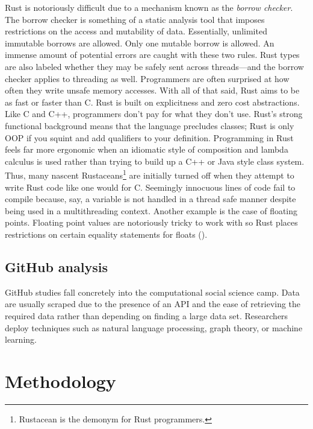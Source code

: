 \documentclass[12pt, a4paper]{article}
\begin{document}
Rust is notoriously difficult due to a mechanism known as the \textit{borrow checker}. The borrow checker is something of a static analysis tool that imposes restrictions on the access and mutability of data. Essentially, unlimited immutable borrows are allowed. Only one mutable borrow is allowed. An immense amount of potential errors are caught with these two rules. Rust types are also labeled whether they may be safely sent across threads---and the borrow checker applies to threading as well. Programmers are often surprised at how often they write unsafe memory accesses. With all of that said, Rust aims to be as fast or faster than C. Rust is built on explicitness and zero cost abstractions. Like C and C++, programmers don't pay for what they don't use. Rust's strong functional background means that the language precludes classes; Rust is only OOP if you squint and add qualifiers to your definition. Programming in Rust feels far more ergonomic when an idiomatic style of composition and lambda calculus is used rather than trying to build up a C++ or Java style class system. Thus, many nascent Rustaceans\footnote{Rustacean is the demonym for Rust programmers.} are initially turned off when they attempt to write Rust code like one would for C. Seemingly innocuous lines of code fail to compile because, say, a variable is not handled in a thread safe manner despite being used in a multithreading context. Another example is the case of floating points. Floating point values are notoriously tricky to work with so Rust places restrictions on certain equality statements for floats (\cite{programmingrust}).

\subsection{GitHub analysis}
GitHub studies fall concretely into the computational social science camp. Data are usually scraped due to the presence of an API and the ease of retrieving the required data rather than depending on finding a large data set. Researchers deploy techniques such as natural language processing, graph theory, or machine learning.

\section{Methodology}
\end{document}
